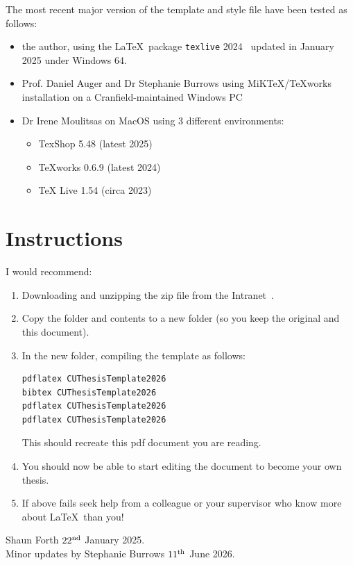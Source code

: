\documentclass[12pt,oneside]{book} %
\begin{document}
The most recent major version of the template and style file have been tested as follows:
\begin{itemize}
\item the author, using the \LaTeX\ package \texttt{texlive} 2024~\cite{texusersgroupTeXLive2025} updated in January 2025 under Windows 64.
\item Prof. Daniel Auger and Dr Stephanie Burrows using MiKTeX/TeXworks \cite{schenkMiKTeXProjectPage2023} installation on a Cran\-field-main\-tained Windows PC
\item Dr Irene Moulitsas on MacOS using 3 different environments:
	\begin{itemize}
	\item TexShop 5.48 (latest 2025) \cite{kockTeXShop2024}
	\item TeXworks 0.6.9 (latest 2024) \cite{schenkMiKTeXProjectPage2023}
	\item TeX Live 1.54 (circa 2023) \cite{texusersgroupTeXLive2025}
	\end{itemize}
\end{itemize}

\section{Instructions}
\label{sec:Instructions}
I would recommend:
\begin{enumerate}
\item Downloading and unzipping the zip file from the Intranet~\cite{cranfielduniversityTemplatesThesisEnd2026}.
\item  Copy the folder and contents to a new folder (so you keep the original and this document).
\item In the new folder, compiling the template as follows:
\begin{verbatim}
pdflatex CUThesisTemplate2026
bibtex CUThesisTemplate2026
pdflatex CUThesisTemplate2026
pdflatex CUThesisTemplate2026
\end{verbatim}
This should recreate this pdf document you are reading.
\item You should now be able to start editing the document to become your own thesis.
\item If above fails seek help from a colleague or your supervisor who know more about \LaTeX\ than you! 
\end{enumerate}

\begin{flushright}
Shaun Forth $22^{\rm nd}$ January 2025. \\
Minor updates by Stephanie Burrows $11^{\rm th}$ June 2026.
\end{flushright}
\end{document}
